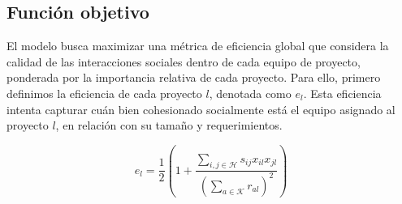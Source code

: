 \documentclass[conference]{IEEEtran}
\begin{document}
\subsection{Función objetivo}

El modelo busca maximizar una métrica de eficiencia global que considera la calidad de las interacciones sociales dentro de cada equipo de proyecto, ponderada por la importancia relativa de cada proyecto. Para ello, primero definimos la eficiencia de cada proyecto \(l\), denotada como \(e_l\). Esta eficiencia intenta capturar cuán bien cohesionado socialmente está el equipo asignado al proyecto \(l\), en relación con su tamaño y requerimientos.

\begin{equation}
    e_l = \frac{1}{2} \left( 1 + \frac{\sum_{i,j \in \mathcal{H}} s_{ij} x_{il} x_{jl}}{\left(\sum_{a \in \mathcal{K}} r_{al}\right)^2} \right)
    \label{eq:efficiency_project_updated} %
\end{equation}
\end{document}
